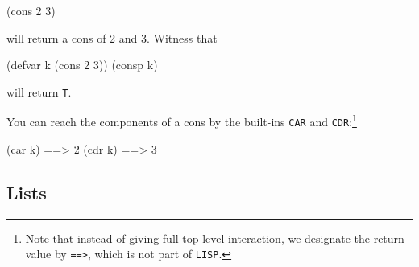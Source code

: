 \documentclass[a4paper,11pt]{article}
\begin{document}
\begin{uenum}
\begin{lispcode}
(cons 2 3)
\end{lispcode}

will return a cons of 2 and 3. Witness that 

\begin{lispcode}
(defvar k  (cons 2 3))
(consp k)
\end{lispcode}

will return \Verb+T+.

You can reach the components of a cons by the built-ins \Verb+CAR+ and \Verb+CDR+:\footnote{Note that instead of giving full top-level interaction, we designate the return value by \Verb+==>+, which is not part of \Verb+LISP+.}

\begin{lispcode}
(car k) ==> 2 
(cdr k) ==> 3
\end{lispcode}

\end{uenum}

\subsection{Lists}
\end{document}
